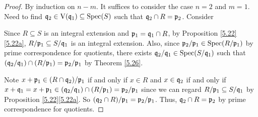 \begin{proof}
    By induction on $n-m$. It suffices to consider the case $n = 2$ and $m = 1$. Need to find $\mathfrak{q}_2 \in \operatorname{V}(\mathfrak{q}_1) \subseteq \operatorname{Spec}(S)$ such that $\mathfrak{q}_2 \cap R = \mathfrak{p}_2$. Consider
    \begin{center}
    \end{center}
    Since $R \subseteq S$ is an integral extension and $\mathfrak{p}_1 = \mathfrak{q}_1 \cap R$, by Proposition \ref{5.22}\ref{5.22a}, $R/\mathfrak{p}_1 \subseteq S/\mathfrak{q}_1$ is an integral extension. Also, since $\mathfrak{p}_2/\mathfrak{p}_1 \in \operatorname{Spec}(R/\mathfrak{p}_1)$ by prime correspondence for quotients, there exists $\mathfrak{q}_2/\mathfrak{q}_1 \in \operatorname{Spec}(S/\mathfrak{q}_1)$ such that $(\mathfrak{q}_2/\mathfrak{q}_1) \cap (R/\mathfrak{p}_1) = \mathfrak{p}_2/\mathfrak{p}_1$ by Theorem \ref{5.26}. \par 
    Note $x + \mathfrak{p}_1 \in (R \cap \mathfrak{q}_2)/\mathfrak{p}_1$ if and only if $x \in R$ and $x \in \mathfrak{q}_2$ if and only if $x + \mathfrak{q}_1 = x + \mathfrak{p}_1 \in (\mathfrak{q}_2/\mathfrak{q}_1) \cap (R/\mathfrak{p}_1) = \mathfrak{p}_2/\mathfrak{p}_1$ since we can regard $R/\mathfrak{p}_1 \subseteq S/\mathfrak{q}_1$ by Proposition \ref{5.22}\ref{5.22a}. So $(\mathfrak{q}_2 \cap R)/\mathfrak{p}_1 = \mathfrak{p}_2/\mathfrak{p}_1$. Thus, $\mathfrak{q}_2 \cap R = \mathfrak{p}_2$ by prime correspondence for quotients.
\end{proof}


